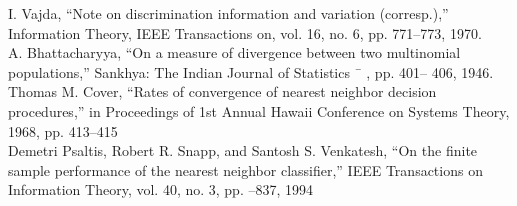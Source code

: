 \documentclass{article}
\begin{document}
	\noindent [32] I. Vajda, “Note on discrimination information and variation (corresp.),”	Information Theory, IEEE 
	\indent Transactions on, vol. 16, no. 6, pp. 771–773, 1970.
	\\ [0.5ex]
	
	\noindent [33] A. Bhattacharyya, “On a measure of divergence between two multinomial populations,” Sankhya: 
	\indent The Indian Journal of Statistics ¯ , pp. 401–
	406, 1946.
	\\[0.5 ex]
	
	\noindent [34] Thomas M. Cover, “Rates of convergence of nearest
	neighbor decision procedures,” in Proceedings \indent of 1st
	Annual Hawaii Conference on Systems Theory, 1968,
	pp. 413–415
	\indent
	\\[0.5ex]
	
	\noindent [35] Demetri Psaltis, Robert R. Snapp, and Santosh S.
	Venkatesh, “On the finite sample performance \indent of the
	nearest neighbor classifier,” IEEE Transactions on Information
	Theory, vol. 40, no. 3, pp. –837, 1994
	\\[0.5ex]
	
	\noindent
	
\end{document}
